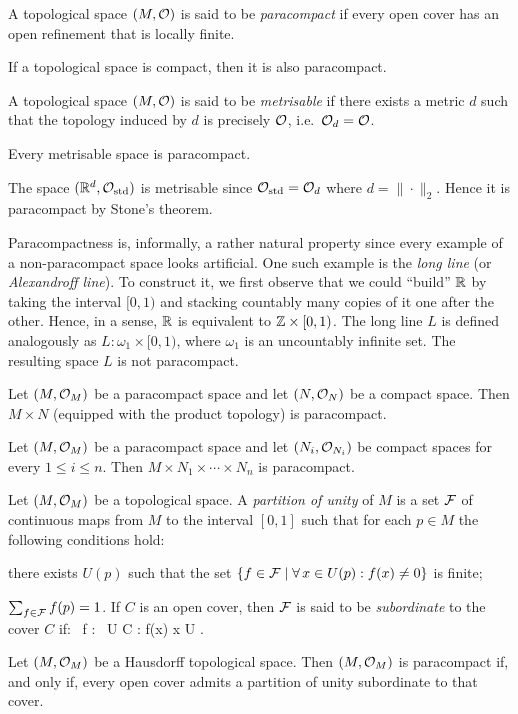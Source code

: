 \bd
A topological space $(M,\mathcal{O})$ is said to be \emph{paracompact} if every open cover has an open refinement that is locally finite.
\ed

\bc
If a topological space is compact, then it is also paracompact.
\ec

\bd
A topological space $(M,\mathcal{O})$ is said to be \emph{metrisable} if there exists a metric $d$ such that the topology induced by $d$ is precisely $\mathcal{O}$, i.e.\ $\mathcal{O}_d=\mathcal{O}$. 
\ed

\bt[Stone]
Every metrisable space is paracompact.
\et

\be
The space $(\mathbb{R}^d,\mathcal{O}_\mathrm{std})$ is metrisable since $\mathcal{O}_\mathrm{std}=\mathcal{O}_d$ where $d = \|\cdot\|_2$. Hence it is paracompact by Stone's theorem.
\ee

\br
Paracompactness is, informally, a rather natural property since every example of a non-paracompact space looks artificial. One such example is the \emph{long line} (or \emph{Alexandroff line}). To construct it, we first observe that we could ``build'' $\mathbb{R}$ by taking the interval $[0,1)$ and stacking countably many copies of it one after the other. Hence, in a sense, $\mathbb{R}$ is equivalent to $\mathbb{Z} \times [0,1)$. The long line $L$ is defined analogously as $L:\omega_1\times [0,1)$, where $\omega_1$ is an uncountably infinite set. The resulting space $L$ is not paracompact.
\er

\bt
Let $(M,\mathcal{O}_M)$ be a paracompact space and let $(N,\mathcal{O}_N)$ be a compact space. Then $M\times N$ (equipped with the product topology) is paracompact.
\et

\bc
Let $(M,\mathcal{O}_M)$ be a paracompact space and let $(N_i,\mathcal{O}_{N_i})$ be compact spaces for every $1\leq i \leq n$. Then $M\times N_1\times\cdots\times N_n$ is paracompact.
\ec

\bd
Let $(M,\mathcal{O}_M)$ be a topological space. A \emph{partition of unity}  of $M$ is a set $\mathcal{F}$ of continuous maps from $M$ to the interval $[0,1]$ such that for each $p\in M$ the following conditions hold:
\ben
\item[i)] there exists $U(p)$ such that the set $\{f \in \mathcal{F} \mid \forall \, x \in U(p):f(x)\neq 0\}$ is finite;
\item[ii)] $\sum_{f\in \mathcal{F}}f(p)=1$.
\een
If $C$ is an open cover, then $\mathcal{F}$ is said to be \emph{subordinate} to the cover $C$ if:
\bse
\forall \, f \in \cF : \exists \, U \in C : f(x)  \imp x \in U .
\ese
\ed

\bt
Let $(M,\mathcal{O}_M)$ be a Hausdorff topological space. Then $(M,\mathcal{O}_M)$ is paracompact if, and only if, every open cover admits a partition of unity subordinate to that cover.
\et

